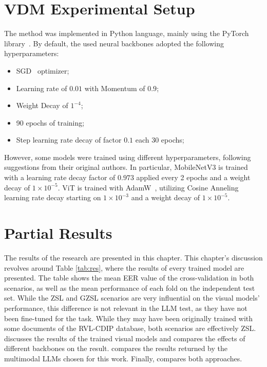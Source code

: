 \section{VDM Experimental Setup}

The method was implemented in Python language, mainly using the PyTorch library~\cite{paszke_pytorch_2019}. By default, the used neural backbones adopted the following hyperparameters:
\begin{itemize}
    \item \gls{SGD}~\cite{robbins_stochastic_1951} optimizer;
    \item Learning rate of $0.01$ with Momentum of $0.9$;
    \item Weight Decay of $1^{-4}$;
    \item 90 epochs of training;
    \item Step learning rate decay of factor $0.1$ each 30 epochs;
\end{itemize}
However, some models were trained using different hyperparameters, following suggestions from their original authors. In particular, MobileNetV3 is trained with a learning rate decay factor of $0.973$ applied every 2 epochs and a weight decay of $1 \times 10^{-5}$. ViT is trained with AdamW~\cite{kingma_adam_2015}, utilizing Cosine Anneling~\cite{liu_super_2022} learning rate decay starting on $1 \times 10^{-3}$ and a weight decay of $1 \times 10^{-5}$.

\section{Partial Results}
\label{sec:results}

The results of the research are presented in this chapter. This chapter's discussion revolves around Table \ref{tab:res}, where the results of every trained model are presented. The table shows the mean EER value of the cross-validation in both scenarios, as well as the mean performance of each fold on the independent test set. While the \gls{ZSL} and \gls{GZSL} scenarios are very influential on the visual models' performance, this difference is not relevant in the \gls{LLM} test, as they have not been fine-tuned for the task. While they may have been originally trained with some documents of the RVL-CDIP database, both scenarios are effectively \gls{ZSL}.  discusses the results of the trained visual models and compares the effects of different backbones on the result.  compares the results returned by the multimodal \glspl{LLM} chosen for this work. Finally,  compares both approaches.

